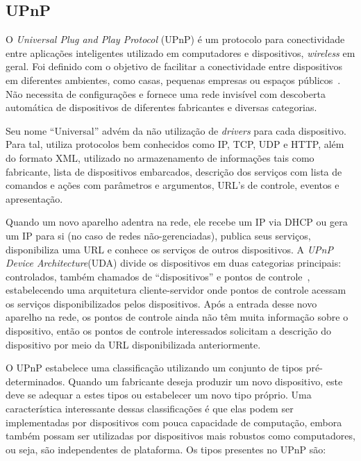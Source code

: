 \subsection{UPnP}
O \emph{Universal Plug and Play Protocol} (UPnP) é um protocolo para conectividade entre aplicações inteligentes utilizado em computadores e dispositivos, \emph{wireless} em geral. Foi definido com o objetivo de facilitar a conectividade entre dispositivos em diferentes ambientes, como casas, pequenas empresas ou espaços públicos~\cite{upnpArch}. Não necessita de configurações e fornece uma rede invisível com descoberta automática de dispositivos de diferentes fabricantes e diversas categorias.

Seu nome ``Universal'' advém da não utilização de \emph{drivers} para cada dispositivo. Para tal, utiliza protocolos bem conhecidos como IP, TCP, UDP e HTTP, além do formato XML, utilizado no armazenamento de informações tais como fabricante, lista de dispositivos embarcados, descrição dos serviços com lista de comandos e ações com parâmetros e argumentos, URL's de controle, eventos e apresentação.

Quando um novo aparelho adentra na rede, ele recebe um IP via DHCP ou gera um IP para si (no caso de redes não-gerenciadas), publica seus serviços, disponibiliza uma URL e conhece os serviços de outros dispositivos. A \emph{UPnP Device Architecture}(UDA) divide os dispositivos em duas categorias principais: controlados, também chamados de ``dispositivos'' e pontos de controle~\cite{upnpArch}, estabelecendo uma arquitetura cliente-servidor onde pontos de controle acessam os serviços disponibilizados pelos dispositivos. Após a entrada desse novo aparelho na rede, os pontos de controle ainda não têm muita informação sobre o dispositivo, então os pontos de controle interessados solicitam a descrição do dispositivo por meio da URL disponibilizada anteriormente.

O UPnP estabelece uma classificação utilizando um conjunto de tipos pré-determinados. Quando um fabricante deseja produzir um novo dispositivo, este deve se adequar a estes tipos ou estabelecer um novo tipo próprio. Uma característica interessante dessas classificações é que elas podem ser implementadas por dispositivos com pouca capacidade de computação, embora também possam ser utilizadas por dispositivos mais robustos como computadores, ou seja, são independentes de plataforma. Os tipos presentes no UPnP são:

